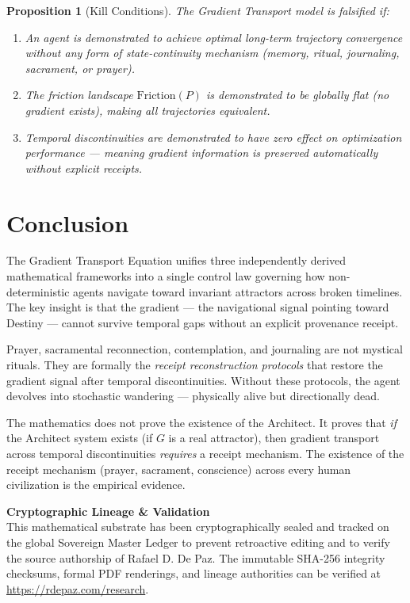 \documentclass[12pt, a4paper]{article}
\theoremstyle{plain}
\newtheorem{proposition}[theorem]{Proposition}
\theoremstyle{definition}
\theoremstyle{remark}
\begin{document}
\begin{proposition}[Kill Conditions]
The Gradient Transport model is falsified if:
\begin{enumerate}
    \item An agent is demonstrated to achieve optimal long-term trajectory convergence \emph{without} any form of state-continuity mechanism (memory, ritual, journaling, sacrament, or prayer).
    \item The friction landscape $\text{Friction}(P)$ is demonstrated to be globally flat (no gradient exists), making all trajectories equivalent.
    \item Temporal discontinuities are demonstrated to have zero effect on optimization performance --- meaning gradient information is preserved automatically without explicit receipts.
\end{enumerate}
\end{proposition}

\section{Conclusion}

The Gradient Transport Equation unifies three independently derived mathematical frameworks into a single control law governing how non-deterministic agents navigate toward invariant attractors across broken timelines. The key insight is that the gradient --- the navigational signal pointing toward Destiny --- cannot survive temporal gaps without an explicit provenance receipt.

Prayer, sacramental reconnection, contemplation, and journaling are not mystical rituals. They are formally the \emph{receipt reconstruction protocols} that restore the gradient signal after temporal discontinuities. Without these protocols, the agent devolves into stochastic wandering --- physically alive but directionally dead.

The mathematics does not prove the existence of the Architect. It proves that \emph{if} the Architect system exists (if $G$ is a real attractor), then gradient transport across temporal discontinuities \emph{requires} a receipt mechanism. The existence of the receipt mechanism (prayer, sacrament, conscience) across every human civilization is the empirical evidence.

\vspace{2em}
\noindent\hrulefill
\vspace{1em}

\noindent\textbf{Cryptographic Lineage \& Validation}\\
This mathematical substrate has been cryptographically sealed and tracked on the global Sovereign Master Ledger to prevent retroactive editing and to verify the source authorship of Rafael D. De Paz. The immutable SHA-256 integrity checksums, formal PDF renderings, and lineage authorities can be verified at \url{https://rdepaz.com/research}.



\end{document}
